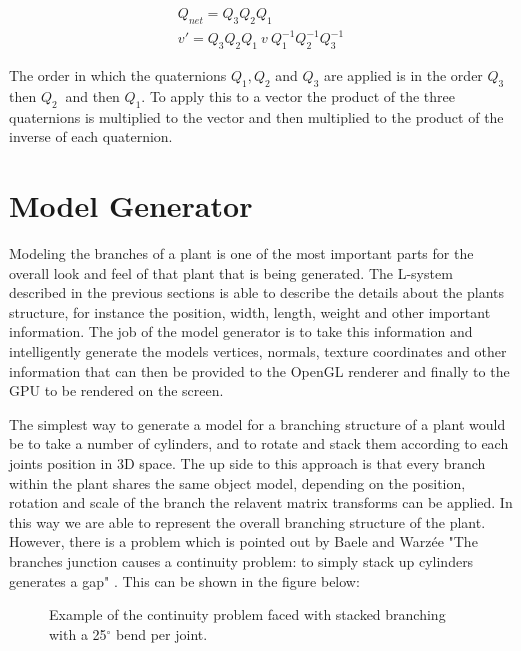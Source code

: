 \begin{equation}
\begin{aligned}
Q_{net} = Q_3 Q_2 Q_1\\
v' = Q_3 Q_2 Q_1~ v~ Q_{1}^{-1} Q_{2}^{-1} Q_{3}^{-1}
\end{aligned}
\end{equation}

\noindent
The order in which the quaternions $Q_1, Q_2$ and $Q_3$ are applied is in the order $Q_3~$ then $Q_2~$ and then $Q_1$. To apply this to a vector the product of the three quaternions is multiplied to the vector and then multiplied to the product of the inverse of each quaternion. \\ 


\section{Model Generator}

Modeling the branches of a plant is one of the most important parts for the overall look and feel of that plant that is being generated. The L-system described in the previous sections is able to describe the details about the plants structure, for instance the position, width, length, weight and other important information. The job of the model generator is to take this information and intelligently generate the models vertices, normals, texture coordinates and other information that can then be provided to the OpenGL renderer and finally to the GPU to be rendered on the screen.

The simplest way to generate a model for a branching structure of a plant would be to take a number of cylinders, and to rotate and stack them according to each joints position in 3D space. The up side to this approach is that every branch within the plant shares the same object model, depending on the position, rotation and scale of the branch the relavent matrix transforms can be applied. In this way we are able to represent the overall branching structure of the plant. However, there is a problem which is pointed out by Baele and Warz\'{e}e "The branches junction causes a continuity problem: to simply stack up cylinders generates a gap" \cite{baele2005real}. This can be shown in the figure below:

\FloatBarrier

\begin{figure}[htbp]
	{\centering
		\vspace{7px}
		\setlength{\fboxrule}{1pt}
		\caption{Example of the continuity problem faced with stacked branching with a 25$^{\circ}$ bend per joint.}
	}
\end{figure}

